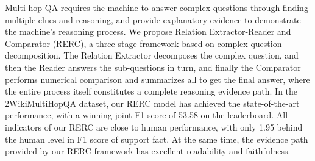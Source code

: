 Multi-hop QA requires the machine to answer complex questions through finding multiple clues and reasoning, and provide explanatory evidence to demonstrate the machine's reasoning process. We propose Relation Extractor-Reader and Comparator (RERC), a three-stage framework based on complex question decomposition. The Relation Extractor decomposes the complex question, and then the Reader answers the sub-questions in turn, and finally the Comparator performs numerical comparison and summarizes all to get the final answer, where the entire process itself constitutes a complete reasoning evidence path. In the 2WikiMultiHopQA dataset, our RERC model has achieved the state-of-the-art performance, with a winning joint F1 score of 53.58 on the leaderboard. All indicators of our RERC are close to human performance, with only 1.95 behind the human level in F1 score of support fact. At the same time, the evidence path provided by our RERC framework has excellent readability and faithfulness.
